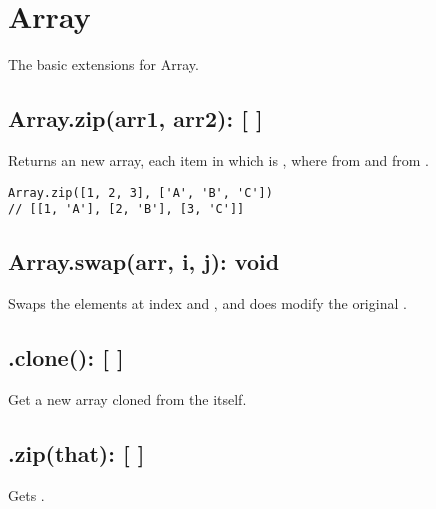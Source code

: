 \section{Array}
The basic extensions for Array.

\subsection*{Array.zip(arr1, arr2): [ ]} 
Returns an new array, each item in which is \cd{[x, y]}, where  from  and  from .

\begin{lstlisting}
Array.zip([1, 2, 3], ['A', 'B', 'C'])
// [[1, 'A'], [2, 'B'], [3, 'C']]
\end{lstlisting}

\subsection*{Array.swap(arr, i, j): void} 
Swaps the elements at index  and , and does modify the original .

\subsection*{.clone(): [ ]}
Get a new array cloned from the  itself.

\subsection*{.zip(that): [ ]}
Gets .
